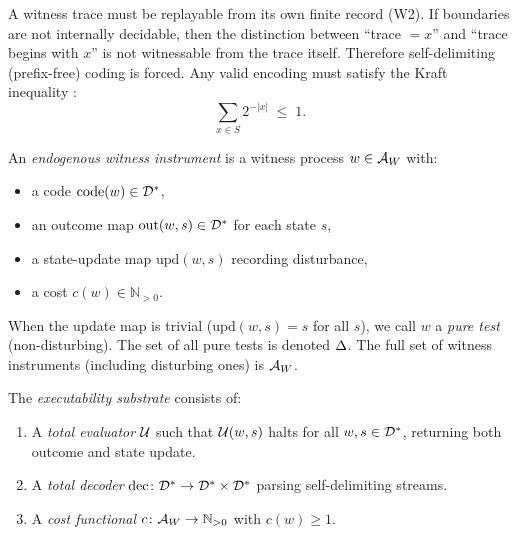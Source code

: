 \begin{proposition}
\label{prop:prefix-forced}
A witness trace must be replayable from its own finite record (W2).  If
boundaries are not internally decidable, then the distinction between
``trace $= x$'' and ``trace begins with $x$'' is not witnessable from the
trace itself.  Therefore self-delimiting (prefix-free) coding is forced.
Any valid encoding must satisfy the Kraft inequality \citep{kraft1949}:
\[
  \sum_{x \in S} 2^{-|x|} \;\leq\; 1.
\]
\end{proposition}

\begin{definition}
\label{def:endogenous-tests}
An \emph{endogenous witness instrument} is a witness process
$w \in \mathcal{A}_W$ with:
\begin{itemize}[nosep]
  \item a code $\mathrm{code}(w) \in \mathcal{D}^*$,
  \item an outcome map $\mathrm{out}(w, s) \in \mathcal{D}^*$ for each state $s$,
  \item a state-update map $\mathrm{upd}(w, s)$ recording disturbance,
  \item a cost $c(w) \in \mathbb{N}_{>0}$.
\end{itemize}
When the update map is trivial ($\mathrm{upd}(w,s) = s$ for all $s$), we
call $w$ a \emph{pure test} (non-disturbing).  The set of all pure tests
is denoted $\Delta$.  The full set of witness instruments (including
disturbing ones) is $\mathcal{A}_W$.
\end{definition}

\begin{definition}
\label{def:executability}
The \emph{executability substrate} consists of:
\begin{enumerate}[nosep, label=(\alph*)]
  \item A \emph{total evaluator} $\mathcal{U}$ such that $\mathcal{U}(w, s)$ halts
        for all $w, s \in \mathcal{D}^*$, returning both outcome and state
        update.
  \item A \emph{total decoder} $\mathrm{dec} \colon \mathcal{D}^* \to
        \mathcal{D}^* \times \mathcal{D}^*$ parsing self-delimiting streams.
  \item A \emph{cost functional} $c \colon \mathcal{A}_W \to \mathbb{N}_{>0}$
        with $c(w) \geq 1$.
\end{enumerate}
\end{definition}

